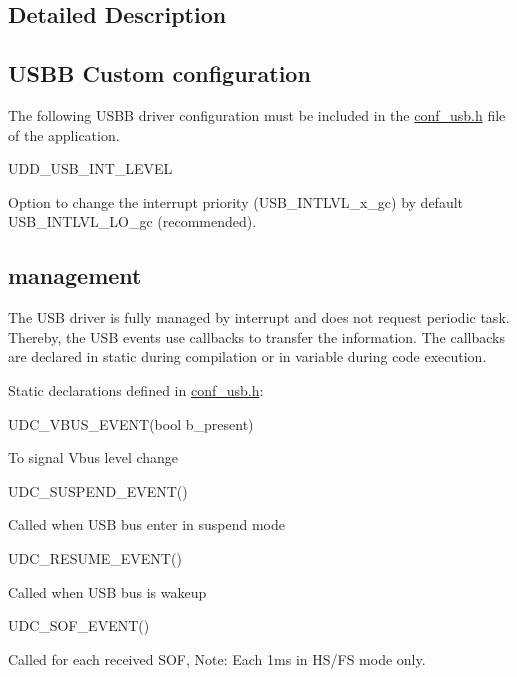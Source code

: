 \subsection{Detailed Description}
\hypertarget{group__udd__xmega__usb__group_USBB_CONF}{}\subsection{U\-S\-B\-B Custom configuration}\label{group__udd__xmega__usb__group_USBB_CONF}
The following U\-S\-B\-B driver configuration must be included in the \hyperlink{conf__usb_8h}{conf\-\_\-usb.\-h} file of the application.

U\-D\-D\-\_\-\-U\-S\-B\-\_\-\-I\-N\-T\-\_\-\-L\-E\-V\-E\-L\par
 Option to change the interrupt priority (U\-S\-B\-\_\-\-I\-N\-T\-L\-V\-L\-\_\-x\-\_\-gc) by default U\-S\-B\-\_\-\-I\-N\-T\-L\-V\-L\-\_\-\-L\-O\-\_\-gc (recommended).\hypertarget{group__udd__xmega__usb__group_Callbacks}{}\subsection{management}\label{group__udd__xmega__usb__group_Callbacks}
The U\-S\-B driver is fully managed by interrupt and does not request periodic task. Thereby, the U\-S\-B events use callbacks to transfer the information. The callbacks are declared in static during compilation or in variable during code execution.

Static declarations defined in \hyperlink{conf__usb_8h}{conf\-\_\-usb.\-h}\-:
\begin{DoxyItemize}
\item U\-D\-C\-\_\-\-V\-B\-U\-S\-\_\-\-E\-V\-E\-N\-T(bool b\-\_\-present)\par
 To signal Vbus level change
\item U\-D\-C\-\_\-\-S\-U\-S\-P\-E\-N\-D\-\_\-\-E\-V\-E\-N\-T()\par
 Called when U\-S\-B bus enter in suspend mode
\item U\-D\-C\-\_\-\-R\-E\-S\-U\-M\-E\-\_\-\-E\-V\-E\-N\-T()\par
 Called when U\-S\-B bus is wakeup
\item U\-D\-C\-\_\-\-S\-O\-F\-\_\-\-E\-V\-E\-N\-T()\par
 Called for each received S\-O\-F, Note\-: Each 1ms in H\-S/\-F\-S mode only.
\end{DoxyItemize}

